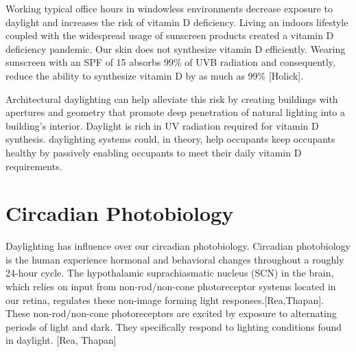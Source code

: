 Working typical office hours in windowless environments decrease exposure to daylight and increases the risk of vitamin D deficiency. Living an indoors lifestyle coupled with the widespread usage of sunscreen products created a vitamin D deficiency pandemic.  Our skin does not synthesize vitamin D efficiently. Wearing sunscreen with an SPF of 15 absorbs 99\% of UVB radiation and consequently, reduce the ability to synthesize vitamin D by as much as 99\% [Holick].

Architectural daylighting can help alleviate this risk by creating buildings with apertures and geometry that promote deep penetration of natural lighting into a building's interior. Daylight is rich in UV radiation required for vitamin D synthesis.  daylighting systems could, in theory, help occupants keep occupants healthy by passively enabling occupants to meet their daily vitamin D requirements.

\section{Circadian Photobiology}
Daylighting has influence over our circadian photobiology. Circadian photobiology is the human experience hormonal and behavioral changes throughout a roughly 24-hour cycle. The hypothalamic suprachiasmatic nucleus (SCN)  in the brain, which relies on input from non-rod/non-cone photoreceptor systems located in our retina, regulates these non-image forming light responses.[Rea,Thapan]. These non-rod/non-cone photoreceptors are excited by exposure to alternating periods of light and dark. They specifically respond to lighting conditions found in daylight. [Rea, Thapan]

